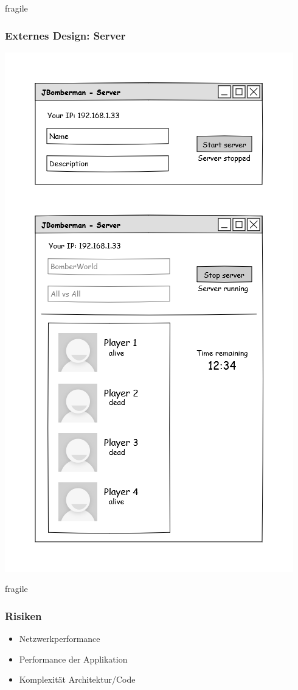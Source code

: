 \documentclass[10pt, compress]{beamer}
\begin{document}
\begin{frame}{fragile}
	\frametitle{Externes Design: Server}
	\begin{center}
	  \includegraphics[scale=0.25]{server}
	\end{center}
	
\end{frame}

\begin{frame}{fragile}
	\frametitle{Risiken}
	\begin{itemize}
	\item Netzwerkperformance
	\item Performance der Applikation
	\item Komplexität Architektur/Code
	\end{itemize}
\end{frame}
\end{document}
